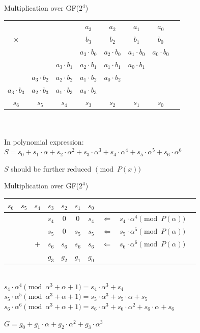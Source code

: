 \documentclass[xcolor=dvipsnames]{beamer}
\begin{document}
\begin{frame}{Multiplication over GF($2^4$)}

 {\begin{tabular}{c c c c c c c c}
  &   &   & $a_3$ & $a_2$ & $a_1$ & $a_0$  \\ 
 $\times$&   &   & $b_3$ & $b_2$ & $b_1$ & $b_0$  \\ 
 \hline
 &   &   & $a_3\cdot b_0$ & $a_2 \cdot b_0$ & $a_1\cdot b_0$ & $a_0\cdot b_0$ \\
 &  & $a_3\cdot b_1$ & $a_2\cdot b_1$ & $a_1 \cdot b_1$ & $a_0\cdot b_1$ &   \\
 & $a_3\cdot b_2$ & $a_2\cdot b_2$ & $a_1\cdot b_2$ & $a_0\cdot b_2$ &  &   \\
 $a_3\cdot b_3$ & $a_2\cdot b_3$ & $a_1\cdot b_3$ & $a_0\cdot b_3$ &  &  &   \\
 \hline
 $s_6$& $s_5$  & $s_4$  & $s_3$ & $s_2$  & $s_1$   & $s_0$ 
 \end{tabular}\par}

\ \\
\ \\
In polynomial expression:\\
$S=s_0+s_1\cdot \alpha+s_2\cdot \alpha^2+s_3\cdot \alpha^3+s_4\cdot \alpha^4+s_5\cdot \alpha^5+s_6\cdot \alpha^6$

\bigskip

$S$ should be further reduced $\pmod {P(x)}$
\end{frame}

\begin{frame}{Multiplication over GF($2^4$)}

 {\begin{tabular}{c c c| c c c c |c c c}
  $s_6$& $s_5$  & $s_4$  & $s_3$ & $s_2$  & $s_1$   & $s_0$ & &  \\
 \hline
 & & &$s_4$ & $0$&$0$ &$s_4$  &$\Leftarrow$ & $s_4\cdot \alpha^4 \pmod{ P(\alpha)}$\\
 & & &$s_5$ & $0$&$s_5$ &$s_5$ & $\Leftarrow$ & $s_5\cdot \alpha^5 \pmod{ P(\alpha)}$\\
 & &$+$ &$s_6$ & $s_6$&$s_6$ &$s_6$  & $\Leftarrow$ & $s_6\cdot \alpha^6
 \pmod{ P(\alpha)}$\\
 \hline
 & & & $g_3$ & $g_2$ &$g_1$ & $g_0$
 \end{tabular}\par}

\ \\

$s_4\cdot \alpha^4 \pmod {\alpha^3+\alpha+1}=s_4\cdot \alpha^3+s_4$ \\
$s_5\cdot \alpha^5 \pmod {\alpha^3+\alpha+1}=s_5\cdot \alpha^3+s_5\cdot \alpha+s_5$ \\
$s_6\cdot \alpha^6 \pmod {\alpha^3+\alpha+1}=s_6\cdot \alpha^3+s_6\cdot \alpha^2+s_6\cdot \alpha+s_6$ 
\bigskip

$G=g_0+g_1\cdot \alpha+g_2\cdot \alpha^2+g_3\cdot \alpha^3$
\end{frame}
\end{document}
